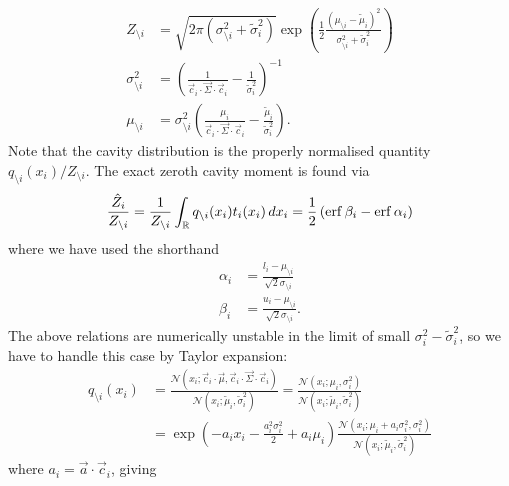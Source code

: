 \documentclass[11pt,twoside]{report}
\begin{document}
\begin{align}
  Z_{\setminus i}
  &=
  \sqrt{2 \pi (\sigma_{\setminus i}^2 + \tilde{\sigma}_i^2)}
  \exp{\left(
    \frac{1}{2}
    \frac{(\mu_{\setminus i} - \tilde{\mu}_i)^2}{\sigma_{\setminus i}^2 + \tilde{\sigma}_i^2}
    \right)}
        \\
  \sigma_{\setminus i}^2 &= \left(
  \frac{1}{\vec{c}_i \cdot \vec{\Sigma} \cdot \vec{c}_i} - \frac{1}{\tilde{\sigma}_i^2}
  \right)^{-1} \\
  \mu_{\setminus i} &= \sigma_{\setminus i}^2 \left(
  \frac{\mu_i}{\vec{c}_i \cdot \vec{\Sigma} \cdot \vec{c}_i} - \frac{\tilde{\mu}_i}{\tilde{\sigma}_i^2}
  \right).
\end{align}
Note that the cavity distribution is the properly normalised quantity $q_{\setminus i}(x_i) / Z_{\setminus i}$.
The exact zeroth cavity moment is found via \cite{Cunningham2011}
\begin{equation}\label{eq:exact-zeroth-moment}
  \frac{\hat{Z}_i}{Z_{\setminus i}} =
  \frac{1}{Z_{\setminus i}}
  \int_{\mathbb{R}} q_{\setminus i}(x_i) t_i(x_i) \, dx_i
  = \frac{1}{2} \left( \operatorname{erf}{\beta_i} - \operatorname{erf}{\alpha_i} \right)
\end{equation}
where we have used the shorthand
\begin{align}
  \alpha_i &= \frac{l_i - \mu_{\setminus i}}{\sqrt{2} \sigma_{\setminus i}} \\
  \beta_i &= \frac{u_i - \mu_{\setminus i}}{\sqrt{2} \sigma_{\setminus i}}.
\end{align}
The above relations are numerically unstable in the limit of small $\sigma_i^2 - \tilde{\sigma}_i^2$, so we have to handle this case by Taylor expansion:
\begin{align}
  q_{\setminus i}(x_i) &=
  \frac{
    \mathcal{N}(x_i; \vec{c}_i \cdot \vec{\mu}, \vec{c}_i \cdot \vec{\Sigma} \cdot \vec{c}_i)
  }{
    \mathcal{N}(x_i; \tilde{\mu}_i, \tilde{\sigma}_i^2)
  }
  =
  \frac{\mathcal{N}(x_i; \mu_i, \sigma_i^2)}{
    \mathcal{N}(x_i; \tilde{\mu}_i, \tilde{\sigma}_i^2)
  }
  \nonumber \\ &=
  \exp{\left(-a_i x_i
    - \frac{a_i^2 \sigma_i^2}{2}
    + a_i \mu_i
    \right)}
  \frac{\mathcal{N}(x_i; \mu_i + a_i \sigma_i^2, \sigma_i^2)}{
    \mathcal{N}(x_i; \tilde{\mu}_i, \tilde{\sigma}_i^2)
  }
\end{align}
where $a_i = \vec{a} \cdot \vec{c}_i$, giving
\end{document}
